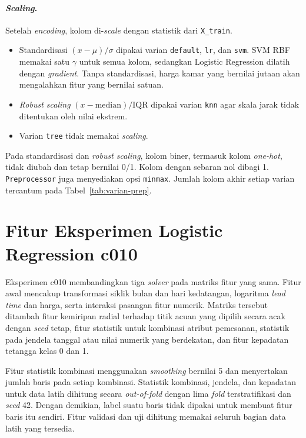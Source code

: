 \paragraph{\textit{Scaling}.} Setelah \textit{encoding}, kolom di-\textit{scale}
dengan statistik dari \texttt{X\_train}.
\begin{itemize}
	\item Standardisasi $(x-\mu)/\sigma$ dipakai varian \texttt{default},
	\texttt{lr}, dan \texttt{svm}. SVM RBF memakai satu $\gamma$ untuk semua
	kolom, sedangkan Logistic Regression dilatih dengan \textit{gradient}.
	Tanpa standardisasi, harga kamar yang bernilai jutaan akan mengalahkan fitur
	yang bernilai satuan.
	\item \textit{Robust scaling} $(x-\mathrm{median})/\mathrm{IQR}$ dipakai varian
	\texttt{knn} agar skala jarak tidak ditentukan oleh nilai ekstrem.
	\item Varian \texttt{tree} tidak memakai \textit{scaling}.
\end{itemize}
Pada standardisasi dan \textit{robust scaling}, kolom biner, termasuk kolom
\textit{one-hot}, tidak diubah dan tetap bernilai 0/1. Kolom dengan sebaran nol
dibagi 1. \texttt{Preprocessor} juga menyediakan opsi \texttt{minmax}. Jumlah kolom
akhir setiap varian tercantum pada Tabel~\ref{tab:varian-prep}.




\section{Fitur Eksperimen Logistic Regression c010}
\label{sec:lr-c010-features}

Eksperimen c010 membandingkan tiga \textit{solver} pada matriks fitur yang sama.
Fitur awal mencakup transformasi siklik bulan dan hari kedatangan, logaritma
\textit{lead time} dan harga, serta interaksi pasangan fitur numerik. Matriks
tersebut ditambah fitur kemiripan radial terhadap titik acuan yang dipilih secara
acak dengan \textit{seed} tetap, fitur statistik untuk kombinasi atribut
pemesanan, statistik pada jendela tanggal atau nilai numerik yang berdekatan,
dan fitur kepadatan tetangga kelas 0 dan 1.

Fitur statistik kombinasi menggunakan \textit{smoothing} bernilai 5 dan
menyertakan jumlah baris pada setiap kombinasi. Statistik kombinasi, jendela,
dan kepadatan untuk data latih dihitung secara \textit{out-of-fold} dengan lima
\textit{fold} terstratifikasi dan \textit{seed} 42. Dengan demikian, label
suatu baris tidak dipakai untuk membuat fitur baris itu sendiri. Fitur validasi
dan uji dihitung memakai seluruh bagian data latih yang tersedia.

